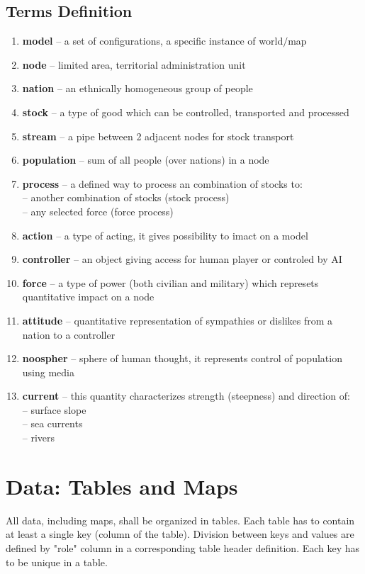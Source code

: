 \documentclass[a4paper,oneside,titlepage]{report}
\begin{document}
\section{Terms Definition}
\begin{enumerate}
  \setlength{\itemsep}{0pt}
  \setlength{\parskip}{0pt}
\item \textbf{model} -- a set of configurations, a specific instance of world$/$map
\item \textbf{node} -- limited area, territorial administration unit
\item \textbf{nation} -- an ethnically homogeneous group of people
\item \textbf{stock} -- a type of good which can be controlled, transported and processed  
\item \textbf{stream} -- a pipe between 2 adjacent nodes for stock transport
\item \textbf{population} -- sum of all people (over nations) in a node
\item \textbf{process} -- a defined way to process an combination of stocks to:\\
  -- another combination of stocks (stock process)\\
  -- any selected force (force process)
\item \textbf{action} -- a type of acting, it gives possibility to imact on a model
\item \textbf{controller} -- an object giving access for human player or controled by AI
\item \textbf{force} -- a type of power (both civilian and military) which represets quantitative impact on a node
\item \textbf{attitude} -- quantitative representation of sympathies or dislikes from a nation to a controller   
\item \textbf{noospher} -- sphere of human thought, it represents control of population using media
\item \textbf{current} -- this quantity characterizes strength (steepness) and direction of:\\
  -- surface slope\\
  -- sea currents\\
  -- rivers
\end{enumerate}

\chapter{Data: Tables and Maps}
All data, including maps, shall be organized in tables. Each table has to contain at least a single key (column of the table). Division between keys and values are defined by "role" column in a corresponding table header definition. Each key has to be unique in a table.
\end{document}
